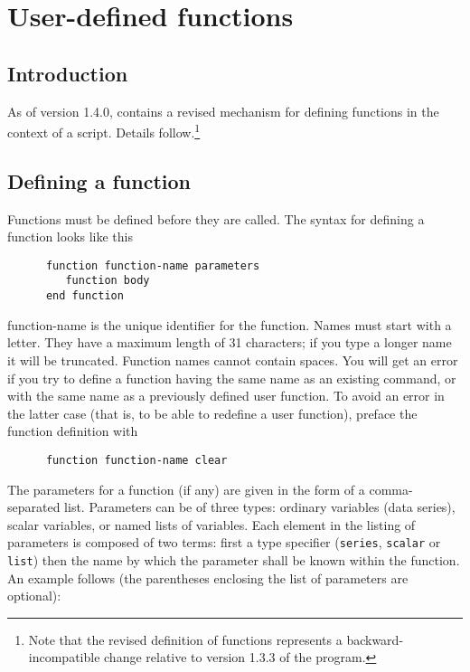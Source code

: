 \chapter{User-defined functions}
\label{functions}



\section{Introduction}
\label{func-intro}

As of version 1.4.0,  contains a
      revised mechanism for defining functions in the context of a script.  
      Details follow.\footnote{Note that the revised definition of functions
	  represents a backward-incompatible change relative to version 1.3.3 of
	  the program.}
    

\section{Defining a function}
\label{func-define}

Functions must be defined before they are called.  The syntax for
      defining a function looks like this
    
\begin{verbatim}
      function function-name parameters
         function body
      end function\end{verbatim}

      function-name is the unique identifier for the
      function. Names must start with a letter. They have a maximum length of 31
      characters; if you type a longer name it will be truncated.  Function names
      cannot contain spaces.  You will get an error if you try to define a function
      having the same name as an existing  command,
      or with the same name as a previously defined user function.  To avoid an
      error in the latter case (that is, to be able to redefine a user
      function), preface the function definition with
    
\begin{verbatim}
      function function-name clear\end{verbatim}

      The parameters for a function (if any) are
      given in the form of a comma-separated list.  Parameters can be of three
      types: ordinary variables (data series), scalar variables, or named lists
      of variables.  Each element in the listing of parameters is composed of
      two terms: first a type specifier (\verb+series+,
      \verb+scalar+ or \verb+list+) then the
      name by which the parameter shall be known within the function.  An
      example follows (the parentheses enclosing the list of parameters are
      optional):
    
